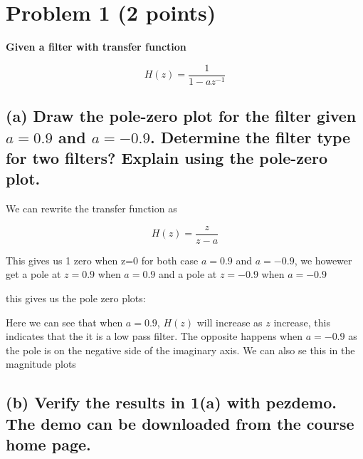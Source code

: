 \section{Problem 1 (2 points)}
\textbf{Given a filter with transfer function}

\[H(z)=\frac{1}{1-a z^{-1}}\]

\subsection*{(a) Draw the pole-zero plot for the filter given \( a=0.9 \) and \( a=-0.9 \). Determine the filter type for two filters? Explain using the pole-zero plot.}
We can rewrite the transfer function as 

\[H(z)=\frac{z}{z-a}\]

This gives us 1 zero when z=0 for both case $a=0.9$ and $a=-0.9$, we howewer get a pole at $z=0.9$ when $a=0.9$ and a pole at $z=-0.9$ when $a=-0.9$

this gives us the pole zero plots:

Here we can see that when $a=0.9$, $H(z)$ will increase as $z$ increase, this indicates that the it is a low pass filter. The opposite happens when $a=-0.9$ as the pole is on the negative side of the imaginary axis. We can also se this in the magnitude plots

\subsection*{(b) Verify the results in 1(a) with pezdemo. The demo can be downloaded from the course home page.}

